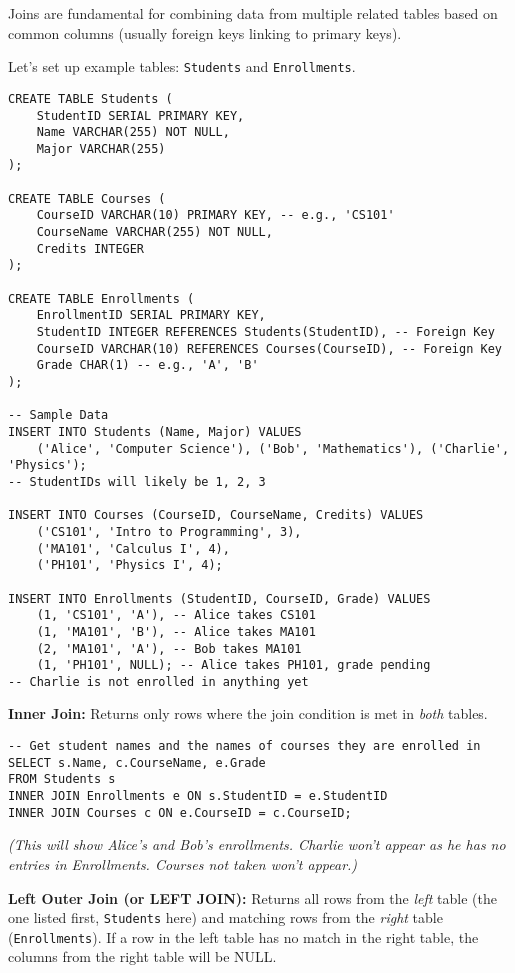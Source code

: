 \documentclass[12pt]{book}
\begin{document}
Joins are fundamental for combining data from multiple related tables based on common columns (usually foreign keys linking to primary keys).

Let's set up example tables: \texttt{Students} and \texttt{Enrollments}.

\begin{lstlisting}[caption={Setup for Join Examples}, label=lst:setup_join_tables]
CREATE TABLE Students (
    StudentID SERIAL PRIMARY KEY,
    Name VARCHAR(255) NOT NULL,
    Major VARCHAR(255)
);

CREATE TABLE Courses (
    CourseID VARCHAR(10) PRIMARY KEY, -- e.g., 'CS101'
    CourseName VARCHAR(255) NOT NULL,
    Credits INTEGER
);

CREATE TABLE Enrollments (
    EnrollmentID SERIAL PRIMARY KEY,
    StudentID INTEGER REFERENCES Students(StudentID), -- Foreign Key
    CourseID VARCHAR(10) REFERENCES Courses(CourseID), -- Foreign Key
    Grade CHAR(1) -- e.g., 'A', 'B'
);

-- Sample Data
INSERT INTO Students (Name, Major) VALUES
    ('Alice', 'Computer Science'), ('Bob', 'Mathematics'), ('Charlie', 'Physics');
-- StudentIDs will likely be 1, 2, 3

INSERT INTO Courses (CourseID, CourseName, Credits) VALUES
    ('CS101', 'Intro to Programming', 3),
    ('MA101', 'Calculus I', 4),
    ('PH101', 'Physics I', 4);

INSERT INTO Enrollments (StudentID, CourseID, Grade) VALUES
    (1, 'CS101', 'A'), -- Alice takes CS101
    (1, 'MA101', 'B'), -- Alice takes MA101
    (2, 'MA101', 'A'), -- Bob takes MA101
    (1, 'PH101', NULL); -- Alice takes PH101, grade pending
-- Charlie is not enrolled in anything yet
\end{lstlisting}

\textbf{Inner Join:}
Returns only rows where the join condition is met in \emph{both} tables.

\begin{lstlisting}[caption={Inner Join Example}, label=lst:inner_join]
-- Get student names and the names of courses they are enrolled in
SELECT s.Name, c.CourseName, e.Grade
FROM Students s
INNER JOIN Enrollments e ON s.StudentID = e.StudentID
INNER JOIN Courses c ON e.CourseID = c.CourseID;
\end{lstlisting}
\textit{(This will show Alice's and Bob's enrollments. Charlie won't appear as he has no entries in Enrollments. Courses not taken won't appear.)}

\textbf{Left Outer Join (or LEFT JOIN):}
Returns all rows from the \emph{left} table (the one listed first, \texttt{Students} here) and matching rows from the \emph{right} table (\texttt{Enrollments}). If a row in the left table has no match in the right table, the columns from the right table will be NULL.
\end{document}
